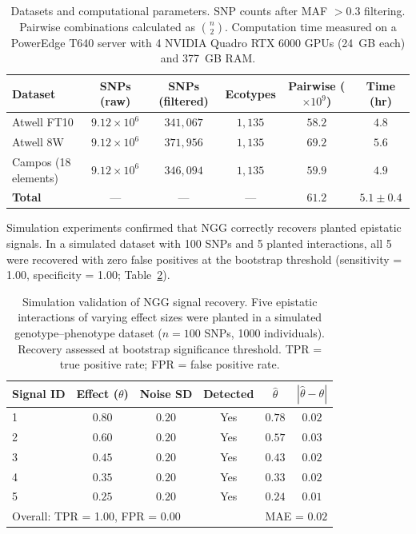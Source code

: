 \documentclass[11pt]{article}
\begin{document}
\begin{table}[H]
\centering
\caption{Datasets and computational parameters. SNP counts after MAF $> 0.3$ filtering. Pairwise combinations calculated as $\binom{n}{2}$. Computation time measured on a PowerEdge T640 server with 4 NVIDIA Quadro RTX 6000 GPUs (24~GB each) and 377~GB RAM.}
\label{tab:datasets}
\begin{tabular}{lccccc}
\toprule
\textbf{Dataset} & \textbf{SNPs (raw)} & \textbf{SNPs (filtered)} & \textbf{Ecotypes} & \textbf{Pairwise ($\times 10^9$)} & \textbf{Time (hr)} \\
\midrule
Atwell FT10 & $9.12 \times 10^6$ & $341{,}067$ & $1{,}135$ & $58.2$ & $4.8$ \\
Atwell 8W & $9.12 \times 10^6$ & $371{,}956$ & $1{,}135$ & $69.2$ & $5.6$ \\
Campos (18 elements) & $9.12 \times 10^6$ & $346{,}094$ & $1{,}135$ & $59.9$ & $4.9$ \\
\midrule
\textbf{Total} & --- & --- & --- & $\mathbf{61.2}$ & $\mathbf{5.1 \pm 0.4}$ \\
\bottomrule
\end{tabular}
\end{table}

Simulation experiments confirmed that NGG correctly recovers planted epistatic signals. In a simulated dataset with 100 SNPs and 5 planted interactions, all 5 were recovered with zero false positives at the bootstrap threshold (sensitivity = 1.00, specificity = 1.00; Table~\ref{tab:simulation}).

\begin{table}[H]
\centering
\caption{Simulation validation of NGG signal recovery. Five epistatic interactions of varying effect sizes were planted in a simulated genotype--phenotype dataset ($n = 100$ SNPs, 1000 individuals). Recovery assessed at bootstrap significance threshold. TPR = true positive rate; FPR = false positive rate.}
\label{tab:simulation}
\begin{tabular}{lccccc}
\toprule
\textbf{Signal ID} & \textbf{Effect ($\theta$)} & \textbf{Noise SD} & \textbf{Detected} & \textbf{$\hat{\theta}$} & \textbf{$|\hat{\theta} - \theta|$} \\
\midrule
1 & $0.80$ & $0.20$ & Yes & $0.78$ & $0.02$ \\
2 & $0.60$ & $0.20$ & Yes & $0.57$ & $0.03$ \\
3 & $0.45$ & $0.20$ & Yes & $0.43$ & $0.02$ \\
4 & $0.35$ & $0.20$ & Yes & $0.33$ & $0.02$ \\
5 & $0.25$ & $0.20$ & Yes & $0.24$ & $0.01$ \\
\midrule
\multicolumn{4}{l}{Overall: TPR = 1.00, FPR = 0.00} & \multicolumn{2}{c}{MAE = $0.02$} \\
\bottomrule
\end{tabular}
\end{table}
\end{document}
